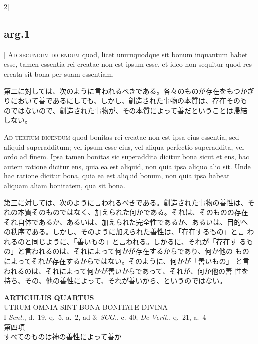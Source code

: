 \documentclass[paper=a4paper,fontsize=10pt,jafontsize=9pt,titlepage]{jlreq}
\begin{document}
\begin{paracol}{2}[\subsection{arg.1}]
{\scshape Ad secundum dicendum} quod, licet unumquodque sit bonum inquantum habet
esse, tamen essentia rei creatae non est ipsum esse, et ideo non
sequitur quod res creata sit bona per suam essentiam.

\switchcolumn

第二に対しては、次のように言われるべきである。各々のものが存在をもつかぎ
 りにおいて善であるにしても、しかし、創造された事物の本質は、存在そのも
 のではないので、創造された事物が、その本質によって善だということは帰結
 しない。

\switchcolumn*[\subsection{ad.3}]

{\scshape Ad tertium dicendum} quod bonitas rei creatae non est ipsa
eius essentia, sed aliquid superadditum; vel ipsum esse eius, vel aliqua
perfectio superaddita, vel ordo ad finem. Ipsa tamen bonitas sic
superaddita dicitur bona sicut et ens, hac autem ratione dicitur ens,
quia ea est aliquid, non quia ipsa aliquo alio sit. Unde hac ratione
dicitur bona, quia ea est aliquid bonum, non quia ipsa habeat aliquam
aliam bonitatem, qua sit bona.

\switchcolumn

第三に対しては、次のように言われるべきである。創造された事物の善性は、そ
 れの本質そのものではなく、加えられた何かである。それは、そのものの存在
 それ自体であるか、あるいは、加えられた完全性であるか、あるいは、目的へ
 の秩序である。しかし、そのように加えられた善性は、「存在するもの」と言
 われるのと同じように、「善いもの」と言われる。しかるに、それが「存在す
 るもの」と言われるのは、それによって何かが存在するからであり、何か他の
 ものによってそれが存在するからではない。そのように、何かが「善いもの」
 と言われるのは、それによって何かが善いからであって、それが、何か他の善
 性を持ち、その、他の善性によって、それが善いから、というのではない。

\end{paracol}
\newpage
{}

\begin{center}
 {\Large {\bfseries ARTICULUS QUARTUS}}\\
 {\large UTRUM OMNIA SINT BONA BONITATE DIVINA}\\
 {\footnotesize I {\itshape Sent.}, d.~19, q.~5, a.~2, ad 3; {\itshape
 SCG.}, c.~40; {\itshape De Verit.}, q.~21, a.~4}\\
 {\Large 第四項\\すべてのものは神の善性によって善か }
\end{center}
\end{document}
